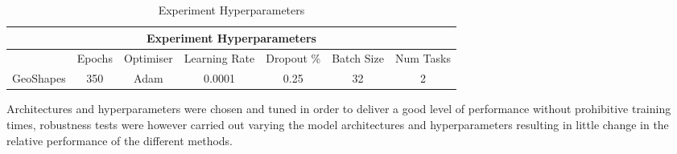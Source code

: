 \begin{table}[h]
\caption{Experiment Hyperparameters} \label{tab:HyperParams}
\begin{tabular}{|c||c|c|c|c|c|c|}
\hline
\multicolumn{7}{|c|}{Experiment Hyperparameters} \\
\hline
 &Epochs & Optimiser &Learning Rate & Dropout \% & Batch Size & Num Tasks \\
\hline
GeoShapes & 350 & Adam & 0.0001 & 0.25 & 32 & 2  \\
\hline
\end{tabular}
\end{table}


Architectures and hyperparameters were chosen and tuned in order to deliver a good level of performance without prohibitive training times, robustness tests were however carried out varying the model architectures and hyperparameters resulting in little change in the relative performance of the different methods. 
